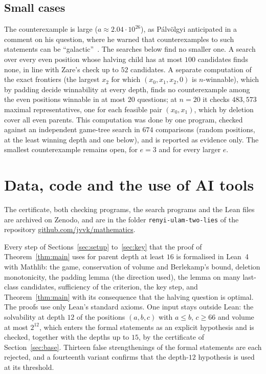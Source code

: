 \documentclass[11pt]{amsart}
\theoremstyle{definition}
\begin{document}
\subsection*{Small cases} The counterexample is large ($a\approx2.04\cdot10^{26}$), as P\'alv\"olgyi anticipated
in a comment on his question, where he warned that counterexamples to such statements can be
``galactic''~\cite{MO}. The searches below find no smaller one. A
search over every even position whose halving child has at most $100$ candidates finds none, in line with Zare's
check up to $52$ candidates. A separate computation of the exact frontiers (the largest $x_2$ for which
$(x_0,x_1,x_2,0)$ is $n$-winnable), which by padding decide winnability at every depth, finds no counterexample among
the even positions winnable in at most $20$ questions; at $n=20$ it checks $483{,}573$ maximal representatives, one for each feasible pair $(x_0,x_1)$, which by deletion cover all even parents. This computation was
done by one program, checked against an independent game-tree search in $674$ comparisons (random positions, at the
least winning depth and one below), and is reported as evidence only. The smallest counterexample remains open, for
$e=3$ and for every larger $e$.

\section{Data, code and the use of AI tools}\label{sec:data}
\sloppy

The certificate, both checking programs, the search programs and the Lean files are archived on Zenodo, and are in
the folder \texttt{renyi-ulam-two-lies} of the repository
\href{https://github.com/jvvk/mathematics}{github.com/jvvk/mathematics}.

Every step of Sections~\ref{sec:setup} to~\ref{sec:key} that the proof of Theorem~\ref{thm:main} uses for parent depth
at least $16$ is formalised in Lean~4 with Mathlib: the game,
conservation of volume and Berlekamp's bound, deletion monotonicity, the padding lemma (the direction used), the
lemma on many last-class candidates, sufficiency of the criterion, the key step, and Theorem~\ref{thm:main} with its
consequence that the halving question is optimal. The proofs use only Lean's standard axioms. One input stays outside
Lean: the solvability at depth $12$ of the positions $(a,b,c)$ with $a\le b$, $c\ge 66$ and volume at most $2^{12}$,
which enters the formal statements as an explicit hypothesis and is checked, together with the depths up to $15$, by
the certificate of Section~\ref{sec:base}. Thirteen false strengthenings of the formal statements are each rejected,
and a fourteenth variant confirms that the depth-$12$ hypothesis is used at its threshold.
\end{document}

